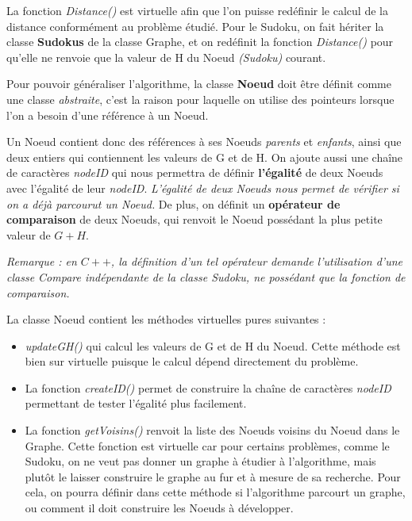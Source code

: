 \begin{description}
La fonction \textit{Distance()} est virtuelle afin que l'on puisse redéfinir le calcul de la distance conformément au problème étudié. Pour le Sudoku, on fait hériter la classe \textbf{Sudokus} de la classe Graphe, et on redéfinit la fonction \textit{Distance()} pour qu'elle ne renvoie que la valeur  de H du Noeud \textit{(Sudoku)} courant.


Pour pouvoir généraliser  l'algorithme, la classe \textbf{Noeud} doit être définit comme une classe \textit{abstraite}, c'est la raison pour laquelle on utilise des pointeurs lorsque l'on a besoin d'une référence à un Noeud.

Un Noeud contient donc des références à ses Noeuds \textit{parents} et \textit{enfants}, ainsi que deux entiers qui contiennent les valeurs de G et de H. On ajoute aussi une chaîne de caractères \textit{nodeID} qui nous permettra de définir \textbf{l'égalité} de deux Noeuds avec l'égalité de leur \textit{nodeID}. \textit{L'égalité de deux Noeuds nous permet de vérifier si on a déjà parcourut un Noeud.} De plus, on définit un \textbf{opérateur de comparaison} de deux Noeuds, qui renvoit le Noeud possédant la plus petite valeur de $G+H$.

\textit{Remarque : en $C++$, la définition d'un tel opérateur demande l'utilisation d'une classe Compare indépendante de la classe Sudoku, ne possédant que la fonction de comparaison.}

La classe Noeud contient les méthodes virtuelles pures suivantes :
\begin{itemize}
\item \textit{updateGH()} qui calcul les valeurs de G et de H du Noeud. Cette méthode est bien sur virtuelle puisque le calcul dépend directement du problème.

\item La fonction \textit{createID()} permet de construire la chaîne de caractères \textit{nodeID} permettant de tester l'égalité plus facilement.

\item La fonction \textit{getVoisins()} renvoit la liste des Noeuds voisins du Noeud dans le Graphe. Cette fonction est virtuelle car pour certains problèmes, comme le Sudoku, on ne veut pas donner un graphe à étudier à l'algorithme, mais plutôt le laisser construire le graphe au fur et à mesure de sa recherche. Pour cela, on pourra définir dans cette méthode si l'algorithme parcourt un graphe, ou comment il doit construire les Noeuds à développer.

\end{itemize}


\end{description}

